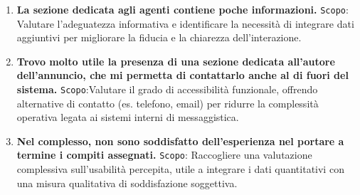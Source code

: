 \begin{enumerate}
	\item \textbf{La sezione dedicata agli agenti contiene poche informazioni.}
	\newline
	\texttt{Scopo}: Valutare l’adeguatezza informativa e identificare la necessità di integrare dati aggiuntivi per migliorare la fiducia e la chiarezza dell’interazione.
	
	\item \textbf{Trovo molto utile la presenza di una sezione dedicata all’autore dell’annuncio, che mi permetta di contattarlo anche al di fuori del sistema.}
	\newline
	\texttt{Scopo}:Valutare il grado di accessibilità funzionale, offrendo alternative di contatto (es. telefono, email) per ridurre la complessità operativa legata ai sistemi interni di messaggistica.
	
	\item \textbf{Nel complesso, non sono soddisfatto dell’esperienza nel portare a termine i compiti assegnati.}
	\newline
	\texttt{Scopo}: Raccogliere una valutazione complessiva sull’usabilità percepita, utile a integrare i dati quantitativi con una misura qualitativa di soddisfazione soggettiva.
	
\end{enumerate}


